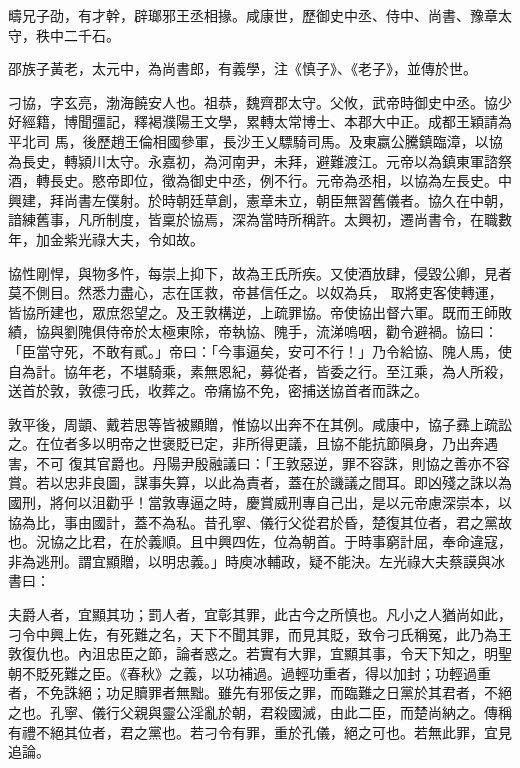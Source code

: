 \begin{pinyinscope}
 疇兄子劭，有才幹，辟瑯邪王丞相掾。咸康世，歷御史中丞、侍中、尚書、豫章太守，秩中二千石。



 邵族子黃老，太元中，為尚書郎，有義學，注《慎子》、《老子》，並傳於世。



 刁協，字玄亮，渤海饒安人也。祖恭，魏齊郡太守。父攸，武帝時御史中丞。協少好經籍，博聞彊記，釋褐濮陽王文學，累轉太常博士、本郡大中正。成都王穎請為平北司
 馬，後歷趙王倫相國參軍，長沙王乂驃騎司馬。及東嬴公騰鎮臨漳，以協為長史，轉潁川太守。永嘉初，為河南尹，未拜，避難渡江。元帝以為鎮東軍諮祭酒，轉長史。愍帝即位，徵為御史中丞，例不行。元帝為丞相，以協為左長史。中興建，拜尚書左僕射。於時朝廷草創，憲章未立，朝臣無習舊儀者。協久在中朝，諳練舊事，凡所制度，皆稟於協焉，深為當時所稱許。太興初，遷尚書令，在職數年，加金紫光祿大夫，令如故。



 協性剛悍，與物多忤，每崇上抑下，故為王氏所疾。又使酒放肆，侵毀公卿，見者莫不側目。然悉力盡心，志在匡救，帝甚信任之。以奴為兵，
 取將吏客使轉運，皆協所建也，眾庶怨望之。及王敦構逆，上疏罪協。帝使協出督六軍。既而王師敗績，協與劉隗俱侍帝於太極東除，帝執協、隗手，流涕嗚咽，勸令避禍。協曰：「臣當守死，不敢有貳。」帝曰：「今事逼矣，安可不行！」乃令給協、隗人馬，使自為計。協年老，不堪騎乘，素無恩紀，募從者，皆委之行。至江乘，為人所殺，送首於敦，敦德刁氏，收葬之。帝痛協不免，密捕送協首者而誅之。



 敦平後，周顗、戴若思等皆被顯贈，惟協以出奔不在其例。咸康中，協子彞上疏訟之。在位者多以明帝之世褒貶已定，非所得更議，且協不能抗節隕身，乃出奔遇害，不可
 復其官爵也。丹陽尹殷融議曰：「王敦惡逆，罪不容誅，則協之善亦不容賞。若以忠非良圖，謀事失算，以此為責者，蓋在於譏議之間耳。即凶殘之誅以為國刑，將何以沮勸乎！當敦專逼之時，慶賞威刑專自己出，是以元帝慮深崇本，以協為比，事由國計，蓋不為私。昔孔寧、儀行父從君於昏，楚復其位者，君之黨故也。況協之比君，在於義順。且中興四佐，位為朝首。于時事窮計屈，奉命違寇，非為逃刑。謂宜顯贈，以明忠義。」時庾冰輔政，疑不能決。左光祿大夫蔡謨與冰書曰：



 夫爵人者，宜顯其功；罰人者，宜彰其罪，此古今之所慎也。凡小之人猶尚如此，
 刁令中興上佐，有死難之名，天下不聞其罪，而見其貶，致令刁氏稱冤，此乃為王敦復仇也。內沮忠臣之節，論者惑之。若實有大罪，宜顯其事，令天下知之，明聖朝不貶死難之臣。《春秋》之義，以功補過。過輕功重者，得以加封；功輕過重者，不免誅絕；功足贖罪者無黜。雖先有邪佞之罪，而臨難之日黨於其君者，不絕之也。孔寧、儀行父親與靈公淫亂於朝，君殺國滅，由此二臣，而楚尚納之。傳稱有禮不絕其位者，君之黨也。若刁令有罪，重於孔儀，絕之可也。若無此罪，宜見追論。




\end{pinyinscope}
